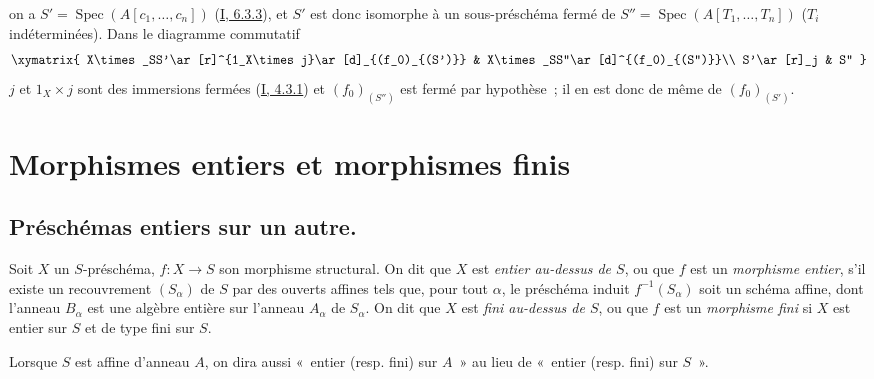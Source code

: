 
on a $S'=\operatorname{Spec}(A[c_1,\ldots,c_n])$
(\hyperref[I.6.3.3-fr]{I, 6.3.3}), et $S'$ est donc isomorphe à un
sous-préschéma fermé de $S''=\operatorname{Spec}(A[T_1,\ldots,T_n])$ ($T_i$
indéterminées). Dans le diagramme commutatif
\[
\xymatrix{
X\times_SS'\ar[r]^{1_X\times j}\ar[d]_{(f_0)_{(S')}} &
X\times_SS''\ar[d]^{(f_0)_{(S'')}}\\
S'\ar[r]_j & S''
}
\]
$j$ et $1_X\times j$ sont des immersions fermées
(\hyperref[I.4.3.1-fr]{I, 4.3.1}) et $(f_0)_{(S'')}$ est fermé par hypothèse~;
il en est donc de même de $(f_0)_{(S')}$. 

\section{Morphismes entiers et morphismes finis}
\label{section:II.6-fr}

\subsection{Préschémas entiers sur un autre.}
\label{subsection:II.6.1-fr}

\begin{definition}[6.1.1]
\label{II.6.1.1-fr}
Soit $X$ un $S$-préschéma, $f:X\to S$ son morphisme structural. On dit que
$X$ est \emph{entier au-dessus de $S$}, ou que $f$ est un \emph{morphisme
entier}, s'il existe un recouvrement $(S_\alpha)$ de $S$ par des ouverts
affines tels que, pour tout $\alpha$, le préschéma induit $f^{-1}(S_\alpha)$
soit un schéma affine, dont l'anneau $B_\alpha$ est une algèbre entière sur
l'anneau $A_\alpha$ de $S_\alpha$. On dit que $X$ est \emph{fini au-dessus de
$S$}, ou que $f$ est un \emph{morphisme fini} si $X$ est entier sur $S$ et de
type fini sur $S$.
\end{definition}

Lorsque $S$ est affine d'anneau $A$, on dira aussi «~entier (resp. fini) sur
$A$~» au lieu de «~entier (resp. fini) sur $S$~».

